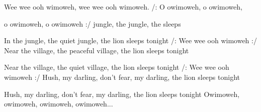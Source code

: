
\zs
Wee wee ooh wimoweh,
wee wee ooh wimoweh.
\ks
\zr
/: O owimoweh, o owimoweh,

o owimoweh, o owimoweh :/
\kr
\zs
{} jungle, the  jungle, the  sleeps 

In the jungle, the quiet jungle, the lion sleeps tonight
\ks
\zr
/: Wee wee ooh wimoweh :/
\kr
\zs
Near the village, the peaceful village, the lion sleeps tonight

Near the village, the quiet village, the lion sleeps tonight
\ks
\zr
/: Wee wee ooh wimoweh :/
\kr
\zs
Hush, my darling, don’t fear, my darling, the lion sleeps tonight

Hush, my darling, don’t fear, my darling, the lion sleeps tonight
\ks
\zr
Owimoweh, owimoweh, owimoweh, owimoweh...
\kr
\kp





